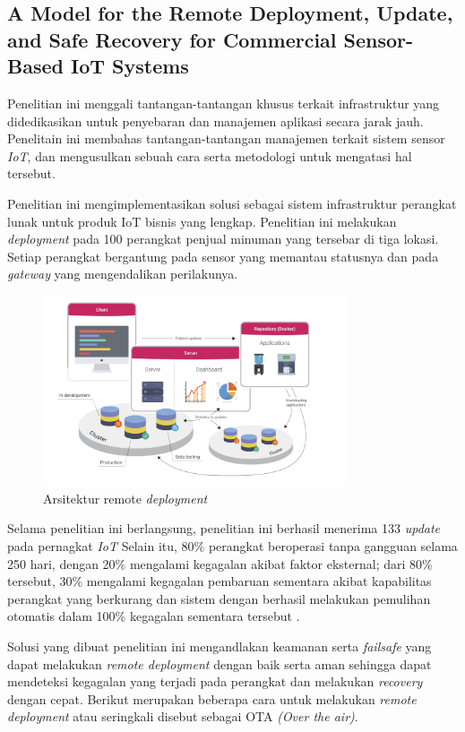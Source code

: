 \subsection{A Model for the Remote Deployment, Update, and Safe Recovery for Commercial Sensor-Based IoT Systems}
Penelitian ini menggali tantangan-tantangan khusus terkait infrastruktur yang didedikasikan untuk penyebaran dan manajemen aplikasi secara jarak jauh. Penelitain ini membahas tantangan-tantangan manajemen terkait sistem sensor \textit{IoT}, dan mengusulkan sebuah cara serta metodologi untuk mengatasi hal tersebut.

Penelitian ini mengimplementasikan solusi sebagai sistem infrastruktur perangkat lunak untuk produk IoT bisnis yang lengkap. Penelitian ini melakukan \textit{deployment} pada 100 perangkat penjual minuman yang tersebar di tiga lokasi. Setiap perangkat bergantung pada sensor yang memantau statusnya dan pada \textit{gateway} yang mengendalikan perilakunya.

\begin{figure}[h]
  \centering
  \includegraphics[width=0.8\textwidth]{resources/chapter-2/arsitektur-remote-deployment.jpg}
  \caption{Arsitektur remote \textit{deployment} \parencite{RemoteDeployment}}
  \label{fig:architecture-remote-deployments}
\end{figure}

Selama penelitian ini berlangsung, penelitian ini berhasil menerima 133 \textit{update} pada pernagkat \textit{IoT} Selain itu, 80\% perangkat beroperasi tanpa gangguan selama 250 hari, dengan 20\% mengalami kegagalan akibat faktor eksternal; dari 80\% tersebut, 30\% mengalami kegagalan pembaruan sementara akibat kapabilitas perangkat yang berkurang dan sistem dengan berhasil melakukan pemulihan otomatis dalam 100\% kegagalan sementara tersebut \parencite{RemoteDeployment}.

Solusi yang dibuat penelitian ini mengandlakan keamanan serta \textit{failsafe} yang dapat melakukan \textit{remote deployment} dengan baik serta aman sehingga dapat mendeteksi kegagalan yang terjadi pada perangkat dan melakukan \textit{recovery} dengan cepat. Berikut merupakan beberapa cara untuk melakukan \textit{remote deployment} atau seringkali disebut sebagai OTA \textit{(Over the air)}.


